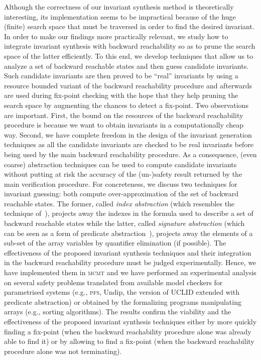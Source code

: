 \documentclass{LMCS}
\theoremstyle{plain}\newtheorem{assumption}[thm]{Assumption}
\theoremstyle{plain}\newtheorem{proposition}[thm]{Proposition}
\theoremstyle{plain}\newtheorem{property}[thm]{Property}
\theoremstyle{plain}\newtheorem{example}[thm]{Example}
\theoremstyle{plain}\newtheorem{claim}[thm]{Claim}
\theoremstyle{plain}\newtheorem{lemma}[thm]{Lemma}
\begin{document}
Although the correctness of our invariant synthesis method is
theoretically interesting, its implementation seems to be impractical
because of the huge (finite) search space that must be traversed in
order to find the desired invariant.  In order to make our findings
more practically relevant, we study how to integrate invariant
synthesis with backward reachability so as to prune the search space
of the latter efficiently.  To this end, we develop techniques that
allow us to analyze a set of backward reachable states and then guess
candidate invariants.  Such candidate invariants are then proved to be
``real'' invariants by using a resource bounded variant of the
backward reachability procedure and afterwards are used during
fix-point checking with the hope that they help pruning the search
space by augmenting the chances to detect a fix-point.  Two
observations are important.  First, the bound on the resources of the
backward reachability procedure is because we want to obtain
invariants in a computationally cheap way.  Second, we have complete
freedom in the design of the invariant generation techniques as all
the candidate invariants are checked to be real invariants before
being used by the main backward reachability procedure.
As a consequence, (even coarse) abstraction techniques can be used to
compute candidate invariants without putting at risk the accuracy of
the (un-)safety result returned by the main verification procedure.
For concreteness, we discuss two techniques for invariant guessing:
both compute over-approximation of the set of backward reachable
states.  The former, called \emph{index abstraction} (which resembles
the technique of~\cite{indexedabs}), projects away the indexes in the
formula used to describe a set of backward reachable states while the
latter, called \emph{signature abstraction} (which can be seen as a
form of predicate abstraction~\cite{seminal}), projects away the
elements of a sub-set of the array variables by quantifier elimination
(if possible).  The effectiveness of the proposed invariant synthesis
techniques and their integration in the backward reachability
procedure must be judged experimentally.  Hence, we have implemented
them in \textsc{mcmt} and we have performed an experimental analysis
on several safety problems translated from available model checkers
for parametrised systems (e.g., \textsc{pfs}, Undip, the version of
UCLID extended with predicate abstraction) or obtained by the
formalizing programs manipulating arrays (e.g., sorting algorithms).
The results confirm the viability and the effectiveness of the
proposed invariant synthesis techniques either by more quickly finding
a fix-point (when the backward reachability procedure alone was
already able to find it) or by allowing to find a fix-point (when the
backward reachability procedure alone was not terminating).
\end{document}
